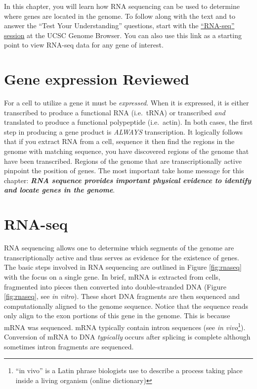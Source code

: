 \documentclass[
]{book}
\begin{document}
In this chapter, you will learn how RNA sequencing can be used to determine where genes are located in the genome. To follow along with the text and to answer the ``Test Your Understanding'' questions, start with the \href{https://genome.ucsc.edu/s/megallegos/Biol\%20310\%3A\%20Module\%202\%20RNA\%2Dseq}{``RNA-seq'' session} at the UCSC Genome Browser. You can also use this link as a starting point to view RNA-seq data for any gene of interest.

\hypertarget{gene-expression-reviewed}{%
\section{Gene expression Reviewed}\label{gene-expression-reviewed}}

For a cell to utilize a gene it must be \emph{expressed}. When it is expressed, it is either transcribed to produce a functional RNA (i.e.~tRNA) or transcribed \emph{and} translated to produce a functional polypeptide (i.e.~actin). In both cases, the first step in producing a gene product is \emph{ALWAYS} transcription. It logically follows that if you extract RNA from a cell, sequence it then find the regions in the genome with matching sequence, you have discovered regions of the genome that have been transcribed. Regions of the genome that are transcriptionally active pinpoint the position of genes. The most important take home message for this chapter: \textbf{\emph{RNA sequence provides important physical evidence to identify and locate genes in the genome}}.

\hypertarget{rna-seq}{%
\section{RNA-seq}\label{rna-seq}}

RNA sequencing allows one to determine which segments of the genome are transcriptionally active and thus serves as evidence for the existence of genes. The basic steps involved in RNA sequencing are outlined in Figure \ref{fig:rnaseq} with the focus on a single gene. In brief, mRNA is extracted from cells, fragmented into pieces then converted into double-stranded DNA (Figure \ref{fig:rnaseq}, see \emph{in vitro}). These short DNA fragments are then sequenced and computationally aligned to the genome sequence. Notice that the sequence reads only align to the exon portions of this gene in the genome. This is because mRNA was sequenced. mRNA typically contain intron sequences (see \emph{in vivo}\footnote{``in vivo'' is a Latin phrase biologists use to describe a process taking place inside a living organism (online dictionary)}). Conversion of mRNA to DNA \emph{typically} occurs after splicing is complete although sometimes intron fragments are sequenced.
\end{document}
